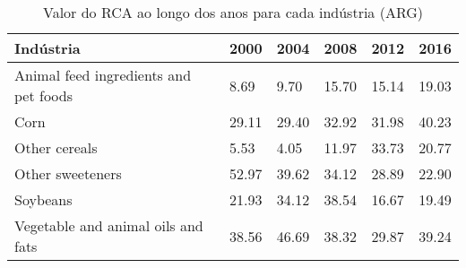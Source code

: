 \begin{table}
\centering
\caption{Valor do RCA ao longo dos anos para cada indústria (ARG)}
\label{tab:ex3-tempo-ARG}
\begin{tabular}{p{6cm}p{1.5cm}p{1.5cm}p{1.5cm}p{1.5cm}p{1.5cm}}
\toprule
                            Indústria &  2000 &  2004 &  2008 &  2012 &  2016 \\
\midrule
Animal feed ingredients and pet foods &  8.69 &  9.70 & 15.70 & 15.14 & 19.03 \\
                                 Corn & 29.11 & 29.40 & 32.92 & 31.98 & 40.23 \\
                        Other cereals &  5.53 &  4.05 & 11.97 & 33.73 & 20.77 \\
                     Other sweeteners & 52.97 & 39.62 & 34.12 & 28.89 & 22.90 \\
                             Soybeans & 21.93 & 34.12 & 38.54 & 16.67 & 19.49 \\
   Vegetable and animal oils and fats & 38.56 & 46.69 & 38.32 & 29.87 & 39.24 \\
\bottomrule
\end{tabular}
\end{table}
